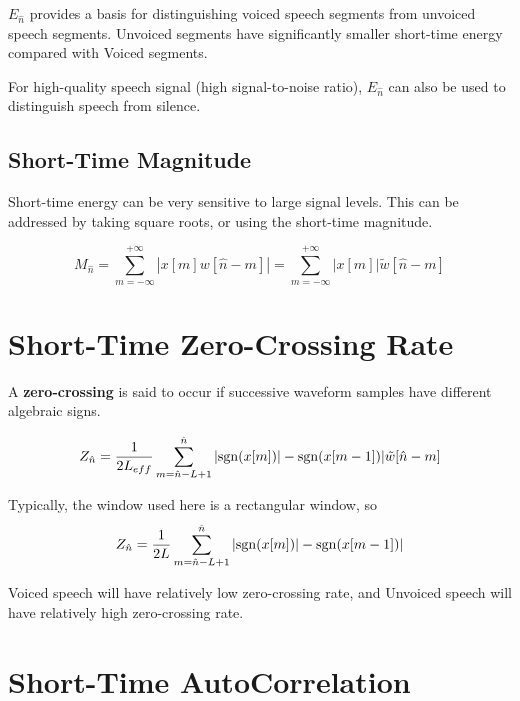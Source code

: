 $E_{\hat{n}}$ provides a basis for distinguishing voiced speech segments from unvoiced speech segments. Unvoiced segments have significantly smaller short-time energy compared with Voiced segments.

For high-quality speech signal (high signal-to-noise ratio), $E_{\hat{n}}$ can also be used to distinguish speech from silence.

\subsection{Short-Time Magnitude}
Short-time energy can be very sensitive to large signal levels. This can be addressed by taking square roots, or using the short-time magnitude.
\begin{definition}
    \[ M_{\hat{n}} = \sum_{m=-\infty}^{+\infty} |x[m]w[\hat{n}-m]| = \sum_{m=-\infty}^{+\infty} |x[m]|\tilde{w}[\hat{n}-m]\]
\end{definition}

\section{Short-Time Zero-Crossing Rate}
A \textbf{zero-crossing} is said to occur if successive waveform samples have different algebraic signs.
\begin{definition}
    \[ Z_{\hat{n}} = \frac{1}{2L_{eff}}\sum_{m=\hat{n}-L+1}^{\hat{n}} |\mathrm{sgn}(x[m])| - \mathrm{sgn}(x[m-1])| \tilde{w}[\hat{n}-m] \]
\end{definition}
Typically, the window used here is a rectangular window, so
\[ Z_{\hat{n}} = \frac{1}{2L}\sum_{m=\hat{n}-L+1}^{\hat{n}} |\mathrm{sgn}(x[m])| - \mathrm{sgn}(x[m-1])| \]

Voiced speech will have relatively low zero-crossing rate, and Unvoiced speech will have relatively high zero-crossing rate.

\section{Short-Time AutoCorrelation}
